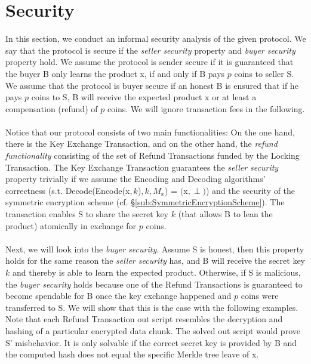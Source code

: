 \documentclass{cacthesis}
\newcounter{protocol}
\begin{document}
        \section{Security}
        \label{sec:Security}
        In this section, we conduct an informal security analysis of the given protocol. We say that the protocol is secure if the \textit{seller security} property and \textit{buyer security} property hold. We assume the protocol is sender secure if it is guaranteed that the buyer B only learns the product \textsf{x}, if and only if B pays $p$ coins to seller S. We assume that the protocol is buyer secure if an honest B is ensured that if he pays $p$ coins to S, B will receive the expected product \textsf{x} or at least a compensation (refund) of $p$ coins. We will ignore transaction fees in the following. \\\\
        Notice that our protocol consists of two main functionalities: On the one hand, there is the Key Exchange Transaction, and on the other hand, the \textit{refund functionality} consisting of the set of Refund Transactions funded by the Locking Transaction. The Key Exchange Transaction guarantees the \textit{seller security} property trivially if we assume the \textsf{Encoding} and \textsf{Decoding} algorithms' correctness (s.t. \textsf{Decode(Encode(}\textsf{x$, k$)}$, k, M_x$\textsf{)} = $($\textsf{x}$, \perp)$) and the security of the symmetric encryption scheme (cf. §\ref{sub:SymmetricEncryptionScheme}). The transaction enables S to share the secret key $k$ (that allows B to lean the product) atomically in exchange for $p$ coins. \\\\
        Next, we will look into the \textit{buyer security}. Assume S is honest, then this property holds for the same reason the \textit{seller security} has, and B will receive the secret key $k$ and thereby is able to learn the expected product. Otherwise, if S is malicious, the \textit{buyer security} holds because one of the Refund Transactions is guaranteed to become spendable for B once the key exchange happened and $p$ coins were transferred to S. We will show that this is the case with the following examples. Note that each Refund Transaction out script resembles the decryption and hashing of a particular encrypted data chunk. The solved out script would prove S' misbehavior. It is only solvable if the correct secret key is provided by B and the computed hash does not equal the specific Merkle tree leave of \textsf{x}.
\end{document}
